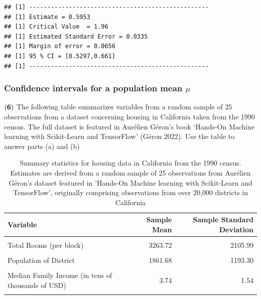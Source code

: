 \documentclass[
]{article}
\begin{document}
\begin{verbatim}
## [1] --------------------------------------------------
## [1] Estimate = 0.5953
## [1] Critical Value  = 1.96
## [1] Estimated Standard Error = 0.0335
## [1] Margin of error = 0.0656
## [1] 95 % CI = [0.5297,0.661]
## [1] --------------------------------------------------
\end{verbatim}

\subsubsection{\texorpdfstring{Confidence intervals for a population
mean
\(\mu\)}{Confidence intervals for a population mean \textbackslash mu}}\label{confidence-intervals-for-a-population-mean-mu}

\(\bf (6)\) The following table summarizes variables from a random
sample of \(25\) observations from a dataset concerning housing in
California taken from the 1990 census. The full dataset is featured in
Aurélien Géron's book `Hands-On Machine learning with Scikit-Learn and
TensorFlow' (Géron 2022). Use the table to answer parts (a) and (b)

\begin{table}[H]
\centering\centering
\caption{\label{tab:unnamed-chunk-7}Summary statistics for housing data in California from the 1990 census. Estimates are derived from a random sample of 25 observations from Aurélien Géron's dataset featured in 'Hands-On Machine learning with Scikit-Learn and TensorFlow', originally comprising observations from over 20,000 districts in California}
\centering
\begin{tabular}[t]{lrr}
\toprule
Variable & Sample Mean & Sample Standard Deviation\\
\midrule
\cellcolor{gray!10}{Median Age of Houses (per block)} & \cellcolor{gray!10}{24.28} & \cellcolor{gray!10}{13.56}\\
Total Rooms (per block) & 3263.72 & 2105.99\\
\cellcolor{gray!10}{Total Bedrooms (per block)} & \cellcolor{gray!10}{640.52} & \cellcolor{gray!10}{380.55}\\
Population of District & 1861.68 & 1193.30\\
\cellcolor{gray!10}{Number of Households (per block)} & \cellcolor{gray!10}{584.24} & \cellcolor{gray!10}{330.38}\\
\addlinespace
Median Family Income (in tens of thousands of USD) & 3.74 & 1.54\\
\cellcolor{gray!10}{Median House value (USD)} & \cellcolor{gray!10}{179320.04} & \cellcolor{gray!10}{109450.56}\\
\bottomrule
\end{tabular}
\end{table}
\end{document}
